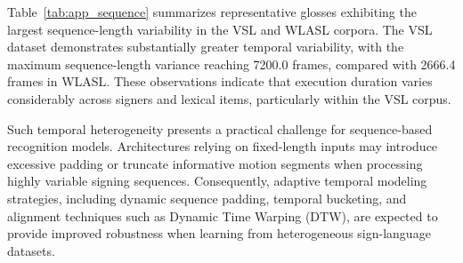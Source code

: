 \documentclass{ieeeaccess}
\begin{document}
Table~\ref{tab:app_sequence} summarizes representative glosses exhibiting the largest sequence-length variability in the VSL and WLASL corpora. The VSL dataset demonstrates substantially greater temporal variability, with the maximum sequence-length variance reaching 7200.0 frames, compared with 2666.4 frames in WLASL. These observations indicate that execution duration varies considerably across signers and lexical items, particularly within the VSL corpus.

Such temporal heterogeneity presents a practical challenge for sequence-based recognition models. Architectures relying on fixed-length inputs may introduce excessive padding or truncate informative motion segments when processing highly variable signing sequences. Consequently, adaptive temporal modeling strategies, including dynamic sequence padding, temporal bucketing, and alignment techniques such as Dynamic Time Warping (DTW), are expected to provide improved robustness when learning from heterogeneous sign-language datasets.
\end{document}
